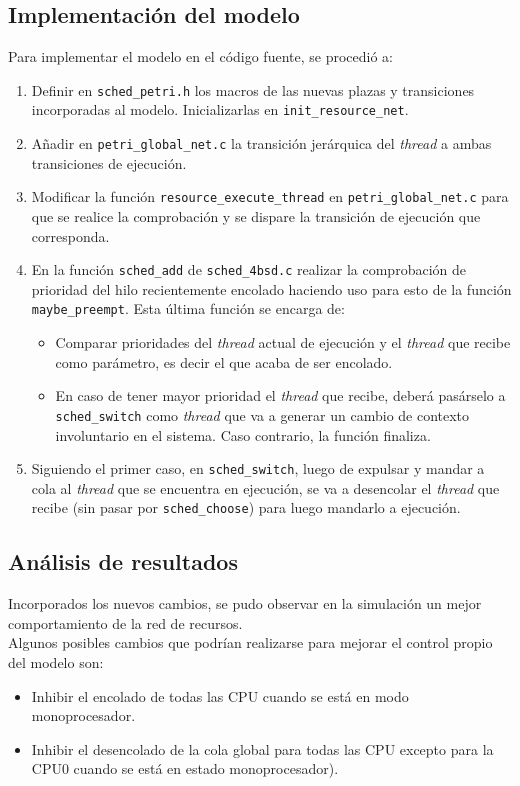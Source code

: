 \documentclass[a4paper]{book}
\begin{document}
\subsection{Implementaci\'on del modelo}
Para implementar el modelo en el c\'odigo fuente, se procedi\'o a:
\begin{enumerate}
\item Definir en \verb|sched_petri.h| los macros de las nuevas plazas y transiciones incorporadas al modelo. Inicializarlas en \verb|init_resource_net|.
\item A\~nadir en \verb|petri_global_net.c| la transici\'on jer\'arquica del \emph{thread} a ambas transiciones de ejecuci\'on.
\item Modificar la funci\'on \verb|resource_execute_thread| en \verb|petri_global_net.c| para que se realice la comprobaci\'on y se dispare la transici\'on de ejecuci\'on que corresponda.
\item En la funci\'on \verb|sched_add| de \verb|sched_4bsd.c| realizar la comprobaci\'on de prioridad del hilo recientemente encolado haciendo uso para esto de la funci\'on \verb|maybe_preempt|. Esta \'ultima funci\'on se encarga de:
\begin{itemize}
\item Comparar prioridades del \emph{thread} actual de ejecuci\'on y el \emph{thread} que recibe como par\'ametro, es decir el que acaba de ser encolado.
\item En caso de tener mayor prioridad el \emph{thread} que recibe, deber\'a pas\'arselo a \verb|sched_switch| como \emph{thread} que va a generar un cambio de contexto involuntario en el sistema. Caso contrario, la funci\'on finaliza.
\end{itemize}
\item Siguiendo el primer caso, en \verb|sched_switch|, luego de expulsar y mandar a cola al \emph{thread} que se encuentra en ejecuci\'on, se va a desencolar el \emph{thread} que recibe (sin pasar por \verb|sched_choose|) para luego mandarlo a ejecuci\'on.
\end{enumerate}

\subsection{An\'alisis de resultados}
Incorporados los nuevos cambios, se pudo observar en la simulaci\'on un mejor comportamiento de la red de recursos.\\

Algunos posibles cambios que podr\'ian realizarse para mejorar el control propio del modelo son:
\begin{itemize}
\item Inhibir el encolado de todas las CPU cuando se est\'a en modo monoprocesador.
\item Inhibir el desencolado de la cola global para todas las CPU excepto para la CPU0 cuando se est\'a en estado monoprocesador).
\end{itemize}
\end{document}
